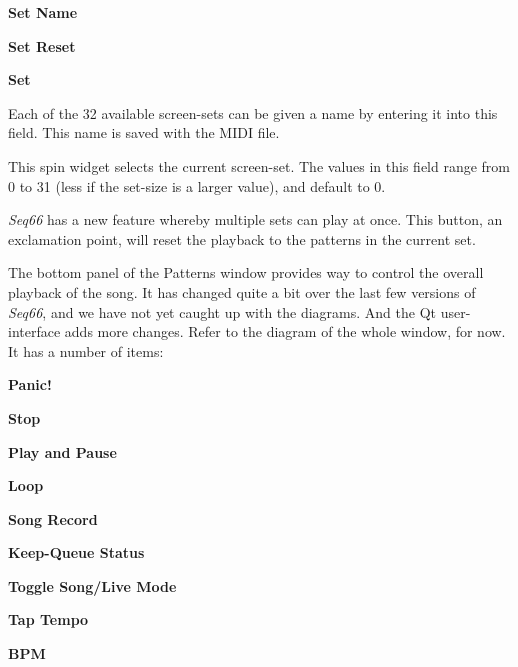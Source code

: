    \begin{enumber}
      \item \textbf{Set Name}
      \item \textbf{Set Reset}
      \item \textbf{Set}
   \end{enumber}

   \setcounter{ItemCounter}{0}      %

   Each of the 32 available screen-sets can be given a name by entering it
   into this field.  This name is saved with the MIDI file.

   This spin widget selects the current screen-set.  The values in this
   field range from 0 to 31 (less if the set-size is a larger value),
   and default to 0.

   \textsl{Seq66} has a new feature whereby multiple sets can play at once.
   This button, an exclamation point, will reset the playback to the patterns
   in the current set.

   The bottom panel of the Patterns window provides way to control the
   overall playback of the song.  It has changed quite a bit over the last few
   versions of \textsl{Seq66}, and we have not yet caught up with the
   diagrams. And the Qt user-interface adds more changes.
   Refer to the diagram of the whole window, for now.
   It has a number of items:

   \begin{enumber}
      \item \textbf{Panic!}
      \item \textbf{Stop}
      \item \textbf{Play and Pause}
      \item \textbf{Loop}
      \item \textbf{Song Record}
      \item \textbf{Keep-Queue Status}
      \item \textbf{Toggle Song/Live Mode}
      \item \textbf{Tap Tempo}
      \item \textbf{BPM}
   \end{enumber}

